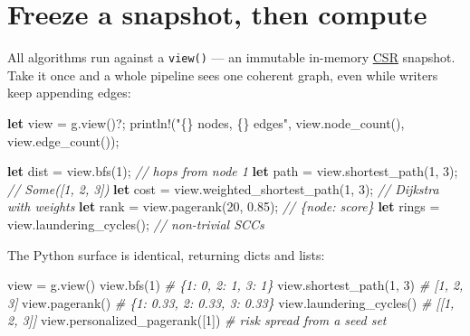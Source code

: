 \documentclass[
  11pt,
  openany]{book}
\newenvironment{Shaded}{}{}
\newcommand{\CommentTok}[1]{\textcolor[rgb]{0.38,0.63,0.69}{\textit{#1}}}
\newcommand{\DecValTok}[1]{\textcolor[rgb]{0.25,0.63,0.44}{#1}}
\newcommand{\KeywordTok}[1]{\textcolor[rgb]{0.00,0.44,0.13}{\textbf{#1}}}
\newcommand{\NormalTok}[1]{#1}
\newcommand{\OperatorTok}[1]{\textcolor[rgb]{0.40,0.40,0.40}{#1}}
\newcommand{\PreprocessorTok}[1]{\textcolor[rgb]{0.74,0.48,0.00}{#1}}
\newcommand{\StringTok}[1]{\textcolor[rgb]{0.25,0.44,0.63}{#1}}
\begin{document}
\section{Freeze a snapshot, then
compute}\label{freeze-a-snapshot-then-compute}

All algorithms run against a \texttt{view()} --- an immutable in-memory
\href{../graph/snapshot.md}{CSR} snapshot. Take it once and a whole
pipeline sees one coherent graph, even while writers keep appending
edges:

\begin{Shaded}
\begin{Highlighting}[]
\KeywordTok{let}\NormalTok{ view }\OperatorTok{=}\NormalTok{ g}\OperatorTok{.}\NormalTok{view()}\OperatorTok{?;}
\PreprocessorTok{println!}\NormalTok{(}\StringTok{"\{\} nodes, \{\} edges"}\OperatorTok{,}\NormalTok{ view}\OperatorTok{.}\NormalTok{node\_count()}\OperatorTok{,}\NormalTok{ view}\OperatorTok{.}\NormalTok{edge\_count())}\OperatorTok{;}

\KeywordTok{let}\NormalTok{ dist   }\OperatorTok{=}\NormalTok{ view}\OperatorTok{.}\NormalTok{bfs(}\DecValTok{1}\NormalTok{)}\OperatorTok{;}                       \CommentTok{// hops from node 1}
\KeywordTok{let}\NormalTok{ path   }\OperatorTok{=}\NormalTok{ view}\OperatorTok{.}\NormalTok{shortest\_path(}\DecValTok{1}\OperatorTok{,} \DecValTok{3}\NormalTok{)}\OperatorTok{;}          \CommentTok{// Some([1, 2, 3])}
\KeywordTok{let}\NormalTok{ cost   }\OperatorTok{=}\NormalTok{ view}\OperatorTok{.}\NormalTok{weighted\_shortest\_path(}\DecValTok{1}\OperatorTok{,} \DecValTok{3}\NormalTok{)}\OperatorTok{;} \CommentTok{// Dijkstra with weights}
\KeywordTok{let}\NormalTok{ rank   }\OperatorTok{=}\NormalTok{ view}\OperatorTok{.}\NormalTok{pagerank(}\DecValTok{20}\OperatorTok{,} \DecValTok{0.85}\NormalTok{)}\OperatorTok{;}           \CommentTok{// \{node: score\}}
\KeywordTok{let}\NormalTok{ rings  }\OperatorTok{=}\NormalTok{ view}\OperatorTok{.}\NormalTok{laundering\_cycles()}\OperatorTok{;}          \CommentTok{// non{-}trivial SCCs}
\end{Highlighting}
\end{Shaded}

The Python surface is identical, returning dicts and lists:

\begin{Shaded}
\begin{Highlighting}[]
\NormalTok{view }\OperatorTok{=}\NormalTok{ g.view()}
\NormalTok{view.bfs(}\DecValTok{1}\NormalTok{)                       }\CommentTok{\# \{1: 0, 2: 1, 3: 1\}}
\NormalTok{view.shortest\_path(}\DecValTok{1}\NormalTok{, }\DecValTok{3}\NormalTok{)          }\CommentTok{\# [1, 2, 3]}
\NormalTok{view.pagerank()                   }\CommentTok{\# \{1: 0.33, 2: 0.33, 3: 0.33\}}
\NormalTok{view.laundering\_cycles()          }\CommentTok{\# [[1, 2, 3]]}
\NormalTok{view.personalized\_pagerank([}\DecValTok{1}\NormalTok{])   }\CommentTok{\# risk spread from a seed set}
\end{Highlighting}
\end{Shaded}
\end{document}
